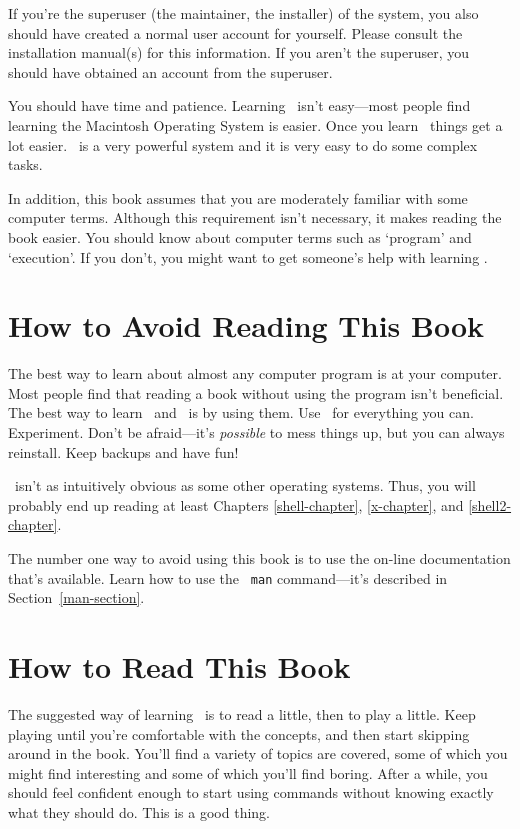 If you're the superuser  (the
maintainer, the installer) of the system, you also should have created
a normal user account for yourself.  Please consult the installation
manual(s) for this information.  If you aren't the superuser, you
should have obtained an account from the superuser. 

You should have time and patience.  Learning \linux\ isn't
easy---most people find learning the Macintosh Operating
System is easier.  Once you learn \linux\ things get a lot easier.
\unix\ is a very powerful system and it is very easy to do some
complex tasks.

In addition, this book assumes that you are moderately familiar with some
computer terms.  Although this requirement isn't necessary, it makes
reading the book easier. You should know about computer terms such as
`program' and `execution'.  If you don't, you might want to get
someone's help with learning \unix.

\section{How to Avoid Reading This Book}

The best way to learn about almost any computer program is at your
computer.  Most people find that reading a book without using the
program isn't beneficial.  The best way to learn \unix\ and
\linux\ is by using them.  Use \linux\ for everything you can.
Experiment.  Don't be afraid---it's {\em possible\/} to mess
things up, but you can always reinstall. Keep backups and have fun!

\unix\ isn't as intuitively obvious as some other operating systems.
Thus, you will probably end up reading at least Chapters
\ref{shell-chapter}, \ref{x-chapter}, and \ref{shell2-chapter}.

The number one way to avoid using this book is to use the on-line
documentation that's available. Learn how to use the {\tt
  man} command---it's described in
Section~\ref{man-section}.

\section{How to Read This Book}

The suggested way of learning \unix\ is to read a little, then to play
a little.  Keep playing until you're comfortable with the concepts,
and then start skipping around in the book.  You'll find a variety of
topics are covered, some of which you might find interesting and some
of which you'll find boring.  After a while, you should feel confident
enough to start using commands without knowing exactly what they
should do.  This is a good thing.


